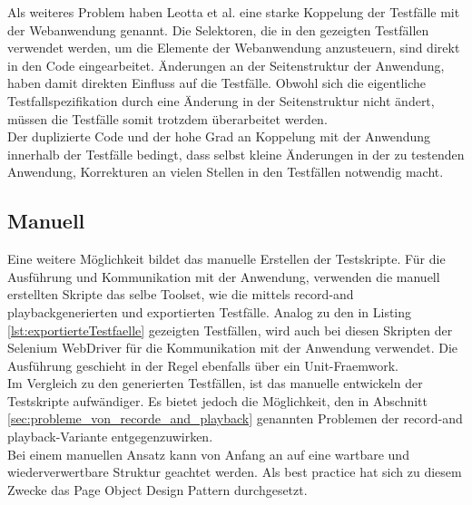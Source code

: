Als weiteres Problem haben Leotta et al. \cite{leotta_repairing_2013} eine starke Koppelung der Testfälle mit der Webanwendung genannt. Die Selektoren, die in den gezeigten Testfällen verwendet werden, um die Elemente der Webanwendung anzusteuern, sind direkt in den Code eingearbeitet. Änderungen an der Seitenstruktur der Anwendung, haben damit direkten Einfluss auf die Testfälle.
Obwohl sich die eigentliche Testfallspezifikation durch eine Änderung in der Seitenstruktur nicht ändert, müssen die Testfälle somit trotzdem überarbeitet werden.\\
Der duplizierte Code und der hohe Grad an Koppelung mit der Anwendung innerhalb der Testfälle bedingt, dass selbst kleine Änderungen in der zu testenden Anwendung, Korrekturen an vielen Stellen in den Testfällen notwendig macht.

\subsection{Manuell}
\label{sec:manuell}
Eine weitere Möglichkeit bildet das manuelle Erstellen der Testskripte. Für die Ausführung und Kommunikation mit der Anwendung, verwenden die manuell erstellten Skripte das selbe Toolset, wie die mittels \grq record-and playback\grq generierten und exportierten Testfälle. Analog zu den in Listing \ref{lst:exportierteTestfaelle} gezeigten Testfällen, wird auch bei diesen Skripten der Selenium WebDriver für die Kommunikation mit der Anwendung verwendet. Die Ausführung geschieht in der Regel ebenfalls über ein Unit-Fraemwork.\\
Im Vergleich zu den generierten Testfällen, ist das manuelle entwickeln der Testskripte aufwändiger.
Es bietet jedoch die Möglichkeit, den in Abschnitt \ref{sec:probleme_von_recorde_and_playback} genannten Problemen der \grq record-and playback\grq -Variante entgegenzuwirken.\\
Bei einem manuellen Ansatz kann von Anfang an auf eine wartbare und wiederverwertbare Struktur geachtet werden.
Als best practice hat sich zu diesem Zwecke das Page Object Design Pattern durchgesetzt.

